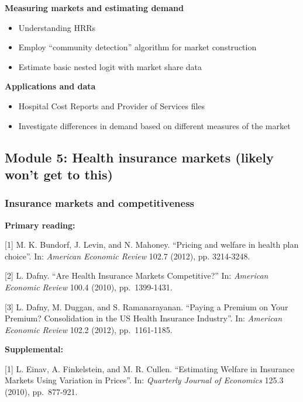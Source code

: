 \documentclass[11pt,]{article}
\providecommand{\tightlist}{%
  \setlength{\itemsep}{0pt}\setlength{\parskip}{0pt}}
\begin{document}
\textbf{Measuring markets and estimating demand}

\begin{itemize}
\tightlist
\item
  Understanding HRRs
\item
  Employ ``community detection'' algorithm for market construction
\item
  Estimate basic nested logit with market share data
\end{itemize}

\textbf{Applications and data}

\begin{itemize}
\tightlist
\item
  Hospital Cost Reports and Provider of Services files
\item
  Investigate differences in demand based on different measures of the
  market
\end{itemize}

\hypertarget{module-5-health-insurance-markets-likely-wont-get-to-this}{%
\subsection{Module 5: Health insurance markets (likely won't get to
this)}\label{module-5-health-insurance-markets-likely-wont-get-to-this}}

\hypertarget{insurance-markets-and-competitiveness}{%
\subsubsection{Insurance markets and
competitiveness}\label{insurance-markets-and-competitiveness}}

\textbf{Primary reading:}

{[}1{]} M. K. Bundorf, J. Levin, and N. Mahoney. ``Pricing and welfare
in health plan choice''. In: \emph{American Economic Review} 102.7
(2012), pp. 3214-3248.

{[}2{]} L. Dafny. ``Are Health Insurance Markets Competitive?'' In:
\emph{American Economic Review} 100.4 (2010), pp.~1399-1431.

{[}3{]} L. Dafny, M. Duggan, and S. Ramanarayanan. ``Paying a Premium on
Your Premium? Consolidation in the US Health Insurance Industry''. In:
\emph{American Economic Review} 102.2 (2012), pp.~1161-1185.

\textbf{Supplemental:}

{[}1{]} L. Einav, A. Finkelstein, and M. R. Cullen. ``Estimating Welfare
in Insurance Markets Using Variation in Prices''. In: \emph{Quarterly
Journal of Economics} 125.3 (2010), pp.~877-921.
\end{document}
